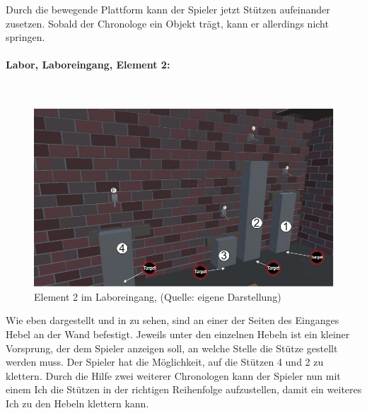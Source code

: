 Durch die bewegende Plattform kann der Spieler jetzt Stützen aufeinander zusetzen. Sobald der Chronologe ein Objekt trägt, kann er allerdings nicht springen.

\paragraph{Labor, Laboreingang, Element 2:}\label{p:lle2}
~
\begin{figure}[ht]
\centering
\includegraphics[width=0.8\linewidth]{content/pictures/Raetsel-L02_R02_R02.jpg}
\caption{Element 2 im Laboreingang, (Quelle: eigene Darstellung)}
\label{fig:L02_R02_R02}
\end{figure}

Wie eben dargestellt und in  zu sehen, sind an einer der Seiten des Einganges Hebel an der Wand befestigt. Jeweils unter den einzelnen Hebeln ist ein kleiner Vorsprung, der dem Spieler anzeigen soll, an welche Stelle die Stütze gestellt werden muss. Der Spieler hat die Möglichkeit, auf die Stützen 4 und 2 zu klettern. Durch die Hilfe zwei weiterer Chronologen kann der Spieler nun mit einem Ich die Stützen in der richtigen Reihenfolge aufzustellen, damit ein weiteres Ich zu den Hebeln klettern kann.

\newpage
